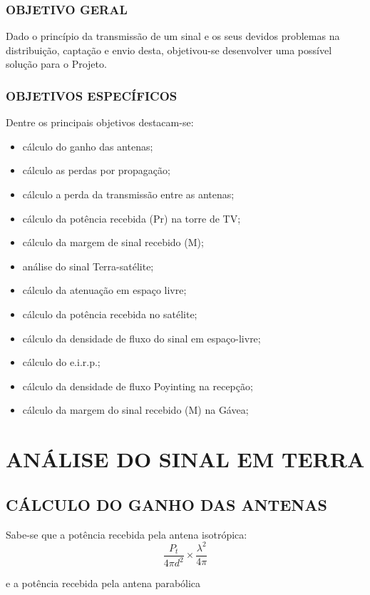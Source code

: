 \documentclass[a4paper,12pt]{article}
\begin{document}
 \subsubsection{OBJETIVO GERAL}
Dado o princípio da transmissão de um sinal e os seus devidos problemas na
distribuição, captação e envio desta, objetivou-se desenvolver uma possível solução
para o Projeto.

 \subsubsection{OBJETIVOS ESPECÍFICOS}
Dentre os principais objetivos destacam-se:
\begin{itemize}
  \item cálculo do ganho das antenas;
  \item cálculo as perdas por propagação;
  \item cálculo a perda da transmissão entre as antenas;
  \item cálculo da potência recebida (Pr) na torre de TV;
  \item cálculo da margem de sinal recebido (M);
  \item análise do sinal Terra-satélite;
  \item cálculo da atenuação em espaço livre;
  \item cálculo da potência recebida no satélite;
  \item cálculo da densidade de fluxo do sinal em espaço-livre;
  \item cálculo do e.i.r.p.;
  \item cálculo da densidade de fluxo Poyinting na recepção;
  \item cálculo da margem do sinal recebido (M) na Gávea;
\end{itemize}
 
 \section{ANÁLISE DO SINAL EM TERRA}
 \subsection{CÁLCULO DO GANHO DAS ANTENAS}
  Sabe-se que a potência recebida pela antena isotrópica:
  \begin{equation}
  \dfrac{P_t}{4 \pi d^2} \times \dfrac{\lambda ^ 2}{4 \pi}
  \end{equation}

e a potência recebida pela antena parabólica
\end{document}
